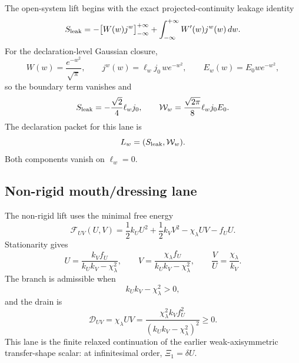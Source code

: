 The open-system lift begins with the exact projected-continuity leakage identity
\begin{equation}
\label{eq:app-part08-stage243-leakage-identity}
S_{\rm leak}
=
-\bigl[W(w)j^w\bigr]_{-\infty}^{+\infty}
+
\int_{-\infty}^{+\infty}W'(w)j^w(w)\,dw.
\end{equation}
For the declaration-level Gaussian closure,
\begin{equation}
\label{eq:app-part08-stage243-gaussian-profile}
W(w)=\frac{e^{-w^2}}{\sqrt\pi},
\qquad
j^w(w)=\ell_w j_0\,w e^{-w^2},
\qquad
E_w(w)=E_0we^{-w^2},
\end{equation}
so the boundary term vanishes and
\begin{equation}
\label{eq:app-part08-stage243-leak-work}
S_{\rm leak}=-\frac{\sqrt2}{4}\ell_wj_0,
\qquad
\mathcal W_w=\frac{\sqrt{2\pi}}{8}\ell_wj_0E_0.
\end{equation}
The declaration packet for this lane is
\begin{equation}
\label{eq:app-part08-stage243-lw}
L_w=(S_{\rm leak},\mathcal W_w).
\end{equation}
Both components vanish on \(\ell_w=0\).

\subsection{Non-rigid mouth/dressing lane}
\label{subsec:app-part08-uv-lane}

The non-rigid lift uses the minimal free energy
\begin{equation}
\label{eq:app-part08-stage243-fuv}
\mathcal F_{UV}(U,V)
=
\frac12k_UU^2+\frac12k_VV^2-\chi_\lambda UV-f_UU.
\end{equation}
Stationarity gives
\begin{equation}
\label{eq:app-part08-stage243-uv-solution}
U=\frac{k_Vf_U}{k_Uk_V-\chi_\lambda^2},
\qquad
V=\frac{\chi_\lambda f_U}{k_Uk_V-\chi_\lambda^2},
\qquad
\frac{V}{U}=\frac{\chi_\lambda}{k_V}.
\end{equation}
The branch is admissible when
\begin{equation}
\label{eq:app-part08-stage243-uv-stability}
k_Uk_V-\chi_\lambda^2>0,
\end{equation}
and the drain is
\begin{equation}
\label{eq:app-part08-stage243-duv}
\mathcal D_{UV}=\chi_\lambda UV
=
\frac{\chi_\lambda^2k_Vf_U^2}{(k_Uk_V-\chi_\lambda^2)^2}\ge0.
\end{equation}
This lane is the finite relaxed continuation of the earlier weak-axisymmetric transfer-shape scalar: at infinitesimal order, \(\Xi_1=\delta U\).

